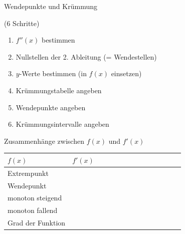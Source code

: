 \documentclass[paper=a6,ngerman,twoside=true,fontsize=14pt, parskip = half]{scrartcl}
\begin{document}
\begin{frage}
	Wendepunkte und Krümmung \bigskip 
	
	(6 Schritte)	
\end{frage}
\begin{antwort}
	\begin{enumerate}
		\item $f''(x)$ bestimmen
		\item Nullstellen der 2. Ableitung (= Wendestellen)
		\item $y$-Werte bestimmen (in $f(x)$ einsetzen)
		\item Krümmungstabelle angeben
		\item Wendepunkte angeben
		\item Krümmungsintervalle angeben						
	\end{enumerate}
\end{antwort}
\begin{frage}
  Zusammenhänge zwischen $f(x)$ und $f'(x)$
	\normalsize
  \begin{center}
    \renewcommand{\arraystretch}{1.3} %
    \begin{tabular}{l | l}
      \textbf{$f(x)$} & \textbf{$f'(x)$} ~~~~~~~~~~~~~~~~~~~~ \\
      \hline
      Extrempunkt & \\
      Wendepunkt & \\
      monoton steigend & \\
      monoton fallend & \\
      Grad der Funktion & \\
    \end{tabular}
  \end{center}
\end{frage}
\end{document}
